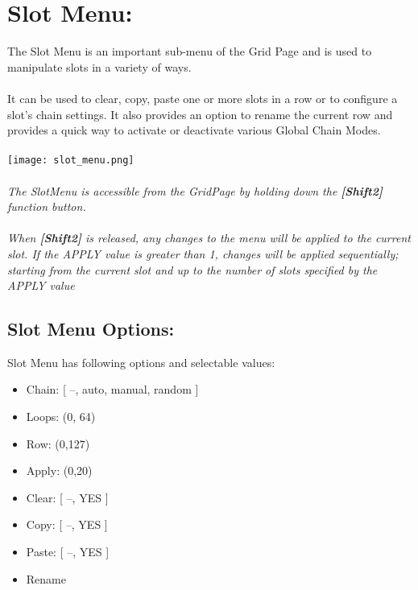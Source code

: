 \chapter{Slot Menu:}

The Slot Menu is an important sub-menu of the Grid Page and is used to manipulate slots in a variety of ways.\\\\
It can be used to clear, copy, paste one or more slots in a row or to configure a slot's chain settings. It also provides an option to rename the current row and provides a quick way to activate or deactivate various Global Chain Modes.
\\\\
\texttt{[image: slot\_menu.png]}
\\\\
\textit{The SlotMenu is accessible from the GridPage by holding down the  \textbf{[Shift2]} function 
button.\\
\\When \textbf{[Shift2]} is released, any changes to the menu will be applied to the current slot. If the APPLY value is greater than 1, changes will be applied sequentially; starting from the current slot and up to the number of slots specified by the APPLY value}

\section{Slot Menu Options:}
Slot Menu has following options and selectable values:
\begin{itemize}

\item{Chain: [ --, auto, manual, random ]}


\item{Loops:  (0, 64)}
\item{Row:    (0,127)}
\item{Apply: (0,20)}
\item{Clear: [ --, YES ]}
\item{Copy: [ --, YES ]}
\item{Paste: [ --, YES ]}
\item{Rename}
\end{itemize}
